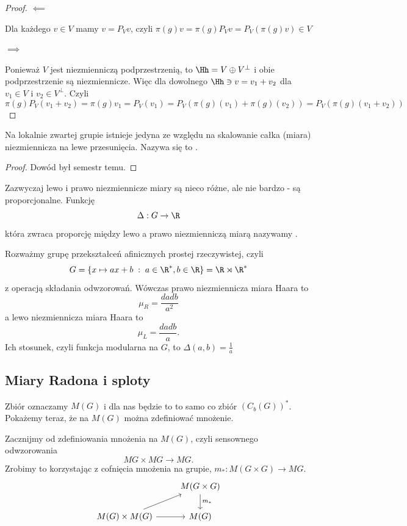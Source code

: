 \begin{proof}
  $\impliedby$

  Dla każdego $v\in V$ mamy $v=P_Vv$, czyli $\pi(g)v=\pi(g)P_Vv=P_V(\pi(g)v)\in V$

  $\implies$

  Ponieważ $V$ jest niezmienniczą podprzestrzenią, to $\Hh=V\oplus V^\perp$ i obie podprzestrzenie są niezmiennicze. Więc dla dowolnego $\Hh\ni v=v_1+v_2$ dla $v_1\in V$ i $v_2\in V^\perp$. Czyli 
  $$\pi(g)P_V(v_1+v_2)=\pi(g)v_1=P_V(v_1)=P_V(\pi(g)(v_1)+\pi(g)(v_2))=P_V(\pi(g)(v_1+v_2))$$
\end{proof}

\begin{fact}{}{}
  Na lokalnie zwartej grupie istnieje jedyna ze względu na skalowanie całka (miara) niezmiennicza na lewe przesunięcia. Nazywa się to .
\end{fact}

\begin{proof}
  Dowód był semestr temu.
\end{proof}

Zazwyczaj lewo i prawo niezmiennicze miary są nieco różne, ale nie bardzo - są proporcjonalne. Funkcję
$$\Delta:G\to \R$$
która zwraca proporcję między lewo a prawo niezmienniczą miarą nazywamy .

\begin{example}
  Rozważmy grupę przekształceń afinicznych prostej rzeczywistej, czyli 
  $$G=\{x\mapsto ax+b\;:\;a\in\R^*, b\in \R\}=\R\rtimes \R^*$$ z operacją składania odwzorowań. Wówczas prawo niezmiennicza miara Haara to 
  $$\mu_R=\frac{dadb}{a^2}$$
  a lewo niezmiennicza miara Haara to
  $$\mu_L=\frac{dadb}{a}.$$
  Ich stosunek, czyli funkcja modularna na $G$, to $\Delta(a,b)=\frac{1}{a}$
\end{example}

\subsection{Miary Radona i sploty}

Zbiór  oznaczamy $M(G)$ i dla nas będzie to to samo co zbiór $(C_b(G))^*$. Pokażemy teraz, że na $M(G)$ można zdefiniować mnożenie.

Zacznijmy od zdefiniowania mnożenia na $M(G)$, czyli sensownego odwzorowania
$$MG\times MG\to MG.$$
Zrobimy to korzystając z cofnięcia mnożenia na grupie, $m_*:M(G\times G)\to MG$.
$$
\begin{tikzcd}
  & M(G\times G)\arrow[d, "m_*"]\\ 
  M(G)\times M(G) \arrow[ur] \arrow[r] & M(G)
\end{tikzcd}
$$

